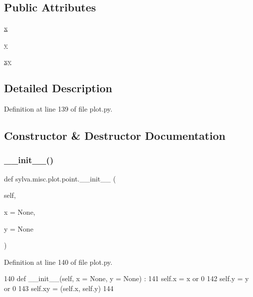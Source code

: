 \subsection*{Public Attributes}
\begin{DoxyCompactItemize}
\item 
\hyperlink{classsylva_1_1misc_1_1plot_1_1point_a268ceb8acaa96e215d84447421cbadc0}{x}
\item 
\hyperlink{classsylva_1_1misc_1_1plot_1_1point_ac2bc4268769be52f4443f74b619cd781}{y}
\item 
\hyperlink{classsylva_1_1misc_1_1plot_1_1point_a0343c9245053942c8de7e013a9c7d450}{xy}
\end{DoxyCompactItemize}


\subsection{Detailed Description}


Definition at line 139 of file plot.\+py.



\subsection{Constructor \& Destructor Documentation}
\mbox{\label{classsylva_1_1misc_1_1plot_1_1point_a081090273abbdf33a6d4817720887cae}} 
\subsubsection{\texorpdfstring{\+\_\+\+\_\+init\+\_\+\+\_\+()}{\_\_init\_\_()}}
{\footnotesize\ttfamily def sylva.\+misc.\+plot.\+point.\+\_\+\+\_\+init\+\_\+\+\_\+ (\begin{DoxyParamCaption}\item[{}]{self,  }\item[{}]{x = {\ttfamily None},  }\item[{}]{y = {\ttfamily None} }\end{DoxyParamCaption})}



Definition at line 140 of file plot.\+py.


\begin{DoxyCode}
140     \textcolor{keyword}{def }\_\_init\_\_(self, x = None, y = None) :
141       self.x = x \textcolor{keywordflow}{or} 0
142       self.y = y \textcolor{keywordflow}{or} 0
143       self.xy = (self.x, self.y)
144 
\end{DoxyCode}


